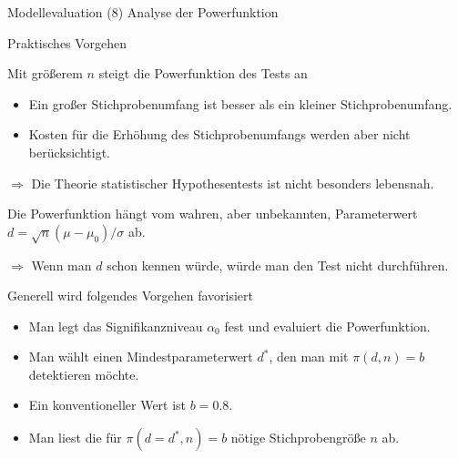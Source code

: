 \documentclass[
  8pt,
  ignorenonframetext,
]{beamer}
\begin{document}
\begin{frame}{Modellevaluation}
\protect\hypertarget{modellevaluation-22}{}
\noindent (8) Analyse der Powerfunktion

Praktisches Vorgehen \small

Mit größerem \(n\) steigt die Powerfunktion des Tests an

\begin{itemize}
\item
  Ein großer Stichprobenumfang ist besser als ein kleiner
  Stichprobenumfang.
\item
  Kosten für die Erhöhung des Stichprobenumfangs werden aber nicht
  berücksichtigt.
\end{itemize}

\(\Rightarrow\) Die Theorie statistischer Hypothesentests ist nicht
besonders lebensnah.

\vspace{1mm}

Die Powerfunktion hängt vom wahren, aber unbekannten, Parameterwert
\(d = \sqrt{n}(\mu - \mu_0)/\sigma\) ab.

\(\Rightarrow\) Wenn man \(d\) schon kennen würde, würde man den Test
nicht durchführen.

\vspace{1mm}

Generell wird folgendes Vorgehen favorisiert

\begin{itemize}
\item
  Man legt das Signifikanzniveau \(\alpha_0\) fest und evaluiert die
  Powerfunktion.
\item
  Man wählt einen Mindestparameterwert \(d^*\), den man mit
  \(\pi(d,n) = b\) detektieren möchte.
\item
  Ein konventioneller Wert ist \(b = 0.8\).
\item
  Man liest die für \(\pi(d = d^*,n) = b\) nötige Stichprobengröße \(n\)
  ab.
\end{itemize}
\end{frame}
\end{document}
